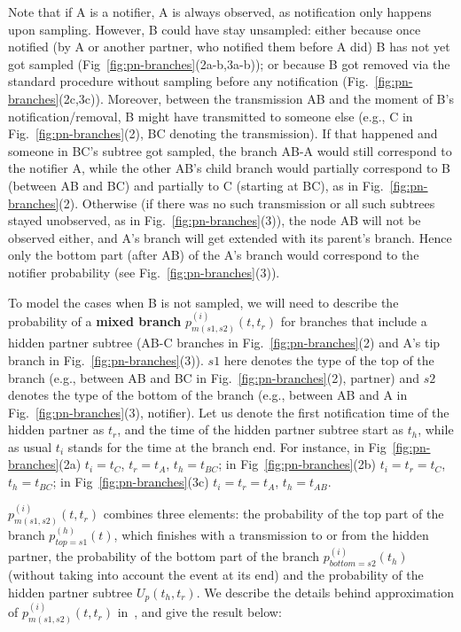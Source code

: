 \documentclass[10pt,letterpaper]{article}
\begin{document}
Note that if A is a notifier, A is always observed, as notification only happens upon sampling. However, B could have stay unsampled: either because once notified (by A or another partner, who notified them before A did) B has not yet got sampled (Fig~\ref{fig:pn-branches}(2a-b,3a-b)); or because B got removed via the standard procedure without sampling before any notification (Fig.~\ref{fig:pn-branches}(2c,3c)). Moreover, between the transmission AB and the moment of B's notification/removal, B might have transmitted to someone else (e.g., C in Fig.~\ref{fig:pn-branches}(2), BC denoting the transmission). If that happened and someone in BC's subtree got sampled, the branch AB-A would still correspond to the notifier A, while the other AB's child branch would partially correspond to B (between AB and BC) and partially to C (starting at BC), as in Fig.~\ref{fig:pn-branches}(2). Otherwise (if there was no such transmission or all such subtrees stayed unobserved, as in Fig.~\ref{fig:pn-branches}(3)), the node AB will not be observed either, and A's branch will get extended with its parent's branch. Hence only the bottom part (after AB) of the A's branch would correspond to the notifier probability (see Fig.~\ref{fig:pn-branches}(3)).



To model the cases when B is not sampled, we will need to describe the probability of a\textbf{ mixed branch} $p_{m(s1,s2)}^{(i)}(t,t_r)$ for branches that include a hidden partner subtree (AB-C branches in Fig.~\ref{fig:pn-branches}(2) and A's tip branch in Fig.~\ref{fig:pn-branches}(3)). $s1$ here denotes the type of the top of the branch (e.g., between AB and BC in Fig.~\ref{fig:pn-branches}(2), partner) and $s2$ denotes the type of the bottom of the branch (e.g., between AB and A in Fig.~\ref{fig:pn-branches}(3), notifier). Let us denote the first notification time of the hidden partner as $t_r$, and the time of the hidden partner subtree start as $t_h$, while as usual $t_i$ stands for the time at the branch end.  For instance, in Fig~\ref{fig:pn-branches}(2a) $t_i=t_C$, $t_r=t_A$, $t_h=t_{BC}$; in Fig~\ref{fig:pn-branches}(2b) $t_i=t_r=t_C$, $t_h=t_{BC}$; in Fig~\ref{fig:pn-branches}(3c) $t_i=t_r=t_A$, $t_h=t_{AB}$. 

$p_{m(s1,s2)}^{(i)}(t,t_r)$ combines three elements: the probability of the top part of the branch $p_{top=s1}^{(h)}(t)$, which finishes with a transmission to or from the hidden partner, the probability of the bottom part of the branch $p_{bottom=s2}^{(i)}(t_h)$ (without taking into account the event at its end) and the probability of the hidden partner subtree $U_p(t_h,t_r)$. We describe the details behind approximation of $p_{m(s1,s2)}^{(i)}(t,t_r)$ in~, and give the result below:
\end{document}

